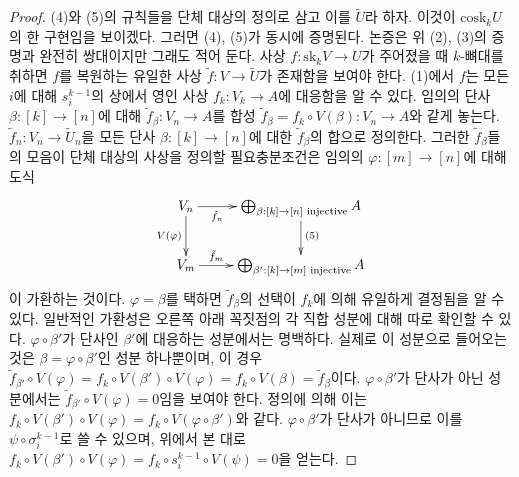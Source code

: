 \begin{proof}
\medskip\noindent
(4)와 (5)의 규칙들을 단체 대상의 정의로 삼고 이를 $\tilde U$라 하자.
이것이 $\text{cosk}_k U$의 한 구현임을 보이겠다. 그러면 (4), (5)가
동시에 증명된다. 논증은 위 (2), (3)의 증명과 완전히 쌍대이지만 그래도
적어 둔다. 사상 $f : \text{sk}_kV \to U$가 주어졌을 때 $k$-뼈대를
취하면 $f$를 복원하는 유일한 사상 $\tilde f : V \to \tilde U$가
존재함을 보여야 한다. (1)에서 $f$는 모든 $i$에 대해
$s^{k - 1}_i$의 상에서 영인 사상 $f_k : V_k \to A$에 대응함을 알 수 있다.
임의의 단사 $\beta : [k] \to [n]$에 대해
$\tilde f_\beta : V_n \to A$를 합성
$\tilde f_\beta = f_k \circ V(\beta) : V_n \to A$와 같게 놓는다.
$\tilde f_n : V_n \to \tilde U_n$을 모든 단사
$\beta : [k] \to [n]$에 대한 $\tilde f_\beta$의 합으로 정의한다.
그러한 $\tilde f_\beta$들의 모음이 단체 대상의 사상을 정의할
필요충분조건은 임의의 $\varphi : [m] \to [n]$에 대해 도식
$$
\xymatrix{
V_n
\ar[d]_{V(\varphi)}
\ar[r]_-{\tilde f_n}
&
\bigoplus_{\beta : [k] \to [n]\text{ injective}} A
\ar[d]^{(5)}
\\
V_m
\ar[r]^-{\tilde f_m}
&
\bigoplus_{\beta' : [k] \to [m]\text{ injective}} A
}
$$
이 가환하는 것이다. $\varphi = \beta$를 택하면 $\tilde f_\beta$의 선택이
$f_k$에 의해 유일하게 결정됨을 알 수 있다. 일반적인 가환성은 오른쪽
아래 꼭짓점의 각 직합 성분에 대해 따로 확인할 수 있다.
$\varphi \circ \beta'$가 단사인 $\beta'$에 대응하는 성분에서는 명백하다.
실제로 이 성분으로 들어오는 것은 $\beta = \varphi \circ \beta'$인 성분
하나뿐이며, 이 경우
$\tilde f_{\beta'} \circ V(\varphi) =
f_k \circ V(\beta') \circ V(\varphi) =
f_k \circ V(\beta) = \tilde f_\beta$이다.
$\varphi \circ \beta'$가 단사가 아닌 성분에서는
$\tilde f_{\beta'} \circ V(\varphi) = 0$임을 보여야 한다.
정의에 의해 이는
$f_k \circ V(\beta') \circ V(\varphi) =
f_k \circ V(\varphi \circ \beta')$와 같다.
$\varphi \circ \beta'$가 단사가 아니므로 이를
$\psi \circ \sigma^{k - 1}_i$로 쓸 수 있으며, 위에서 본 대로
$f_k \circ V(\beta') \circ V(\varphi) =
f_k \circ s^{k - 1}_i \circ V(\psi) = 0$을 얻는다.


\end{proof}
